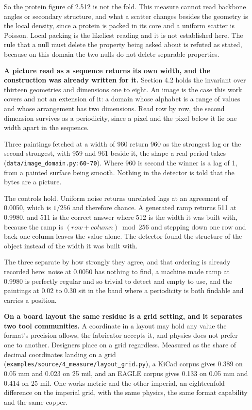 So the protein figure of 2.512 is not the fold. This measure cannot read backbone angles or secondary structure, and what a scatter changes besides the geometry is the local density, since a protein is packed in its core and a uniform scatter is Poisson. Local packing is the likeliest reading and it is not established here. The rule that a null must delete the property being asked about is refuted as stated, because on this domain the two nulls do not delete separable properties.

\textbf{A picture read as a sequence returns its own width, and the construction was already written for it.} Section 4.2 holds the invariant over thirteen geometries and dimensions one to eight. An image is the case this work covers and not an extension of it: a domain whose alphabet is a range of values and whose arrangement has two dimensions. Read row by row, the second dimension survives as a periodicity, since a pixel and the pixel below it lie one width apart in the sequence.

Three paintings fetched at a width of 960 return 960 as the strongest lag or the second strongest, with 959 and 961 beside it, the shape a real period takes (\texttt{data/\allowbreak{}image\_\allowbreak{}domain.\allowbreak{}py:60-\allowbreak{}70}). Where 960 is second the winner is a lag of 1, from a painted surface being smooth. Nothing in the detector is told that the bytes are a picture.

The controls hold. Uniform noise returns unrelated lags at an agreement of 0.0050, which is \(1/256\) and therefore chance. A generated ramp returns 511 at 0.9980, and 511 is the correct answer where 512 is the width it was built with, because the ramp is \((row + column) \bmod 256\) and stepping down one row and back one column leaves the value alone. The detector found the structure of the object instead of the width it was built with.

The three separate by how strongly they agree, and that ordering is already recorded here: noise at 0.0050 has nothing to find, a machine made ramp at 0.9980 is perfectly regular and so trivial to detect and empty to use, and the paintings at 0.02 to 0.30 sit in the band where a periodicity is both findable and carries a position.

\textbf{On a board layout the same residue is a grid setting, and it separates two tool communities.} A coordinate in a layout may hold any value the format's precision allows, the fabricator accepts it, and physics does not prefer one to another. Designers place on a grid regardless. Measured as the share of decimal coordinates landing on a grid (\texttt{examples/\allowbreak{}source/\allowbreak{}4\_\allowbreak{}measure/\allowbreak{}layout\_\allowbreak{}grid.\allowbreak{}py}), a KiCad corpus gives 0.389 on 0.05 mm and 0.023 on 25 mil, and an EAGLE corpus gives 0.133 on 0.05 mm and 0.414 on 25 mil. One works metric and the other imperial, an eighteenfold difference on the imperial grid, with the same physics, the same format capability and the same copper.

